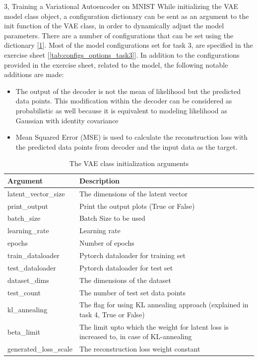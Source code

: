 \documentclass[10pt,a4paper]{article}
\begin{document}
\begin{task}{3, Training a Variational Autoencoder on MNIST}
While initializing the VAE model class object, a configuration dictionary can be sent as an argument to the init function of the VAE class, in order to dynamically adjust the model parameters. There are a number of configurations that can be set using the dictionary [\ref{tab:configs_options}]. Most of the model configurations set for task 3, are specified in the exercise sheet [\ref{tab:configs_options_task3}]. In addition to the configurations provided in the exercise sheet, related to the model, the following notable additions are made:
	\begin{itemize}
		\item The output of the decoder is not the mean of likelihood but the predicted data points. This modification within the decoder can be considered as probabilistic as well because it is equivalent to modeling likelihood as Gaussian with identity covariance
		\item Mean Squared Error (MSE) is used to calculate the reconstruction loss with the predicted data points from decoder and the input data as the target.
	\end{itemize}
	
\begin {table}[H]
\caption {The VAE class initialization arguments} \label{tab:configs_options} 
\begin{center}
\begin{tabular}{ | m{10em} | m{20em}| } 
\hline
Argument & Description \\ 
\hline \hline
latent\_vector\_size & The dimensions of the latent vector \\ 
\hline
print\_output & Print the output plots (True or False) \\
\hline
batch\_size & Batch Size to be used \\
\hline
learning\_rate & Learning rate \\
\hline
epochs & Number of epochs\\
\hline
train\_dataloader & Pytorch dataloader for training set \\
\hline
test\_dataloader & Pytorch dataloader for test set \\
\hline
dataset\_dims & The dimensions of the dataset \\
\hline
test\_count & The number of test set data points \\
\hline
kl\_annealing & The flag for using KL annealing approach (explained in task 4, True or False) \\
\hline
beta\_limit & The limit upto which the weight for latent loss is increased to, in case of KL-annealing \\
\hline
generated\_loss\_scale & The reconstruction loss weight constant \\
\hline
\end{tabular}
\end{center}
\end{table}


\end{task}
\end{document}
